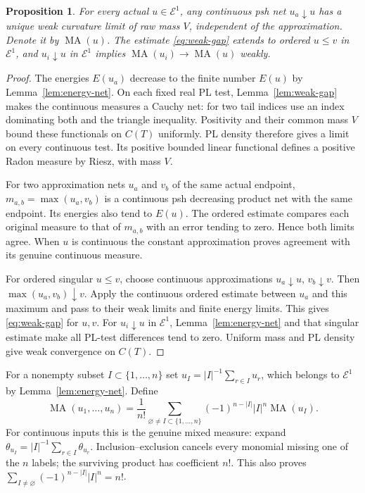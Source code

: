 \documentclass[11pt]{article}
\newtheorem{proposition}[theorem]{Proposition}
\newcommand{\MA}{\operatorname{MA}}
\newcommand{\E}{\mathcal E}
\begin{document}
\begin{proposition}\label{prop:pure}
For every actual $u\in\E^1$, any continuous psh net
$u_a\downarrow u$ has a unique weak curvature limit of raw mass
$V$, independent of the approximation. Denote it by $\MA(u)$.
The estimate \eqref{eq:weak-gap} extends to ordered $u\leq v$ in
$\E^1$, and $u_i\downarrow u$ in $\E^1$ implies
$\MA(u_i)\to\MA(u)$ weakly.
\end{proposition}
\begin{proof}
The energies $E(u_a)$ decrease to the finite number $E(u)$ by
Lemma~\ref{lem:energy-net}. On each fixed real PL test,
Lemma~\ref{lem:weak-gap} makes the continuous measures a Cauchy net:
for two tail indices use an index dominating both and the triangle
inequality. Positivity and their common mass $V$ bound these
functionals on $C(T)$ uniformly. PL density therefore gives a limit
on every continuous test. Its positive bounded linear functional
defines a positive Radon measure by Riesz, with mass $V$.

For two approximation nets $u_a$ and $v_b$ of the same actual
endpoint, $m_{a,b}=\max(u_a,v_b)$ is a continuous psh decreasing
product net with the same endpoint. Its energies also tend to $E(u)$.
The ordered estimate compares each original measure to that of
$m_{a,b}$ with an error tending to zero. Hence both limits agree.
When $u$ is continuous the constant approximation proves agreement
with its genuine continuous measure.

For ordered singular $u\leq v$, choose continuous approximations
$u_a\downarrow u$, $v_b\downarrow v$. Then
$\max(u_a,v_b)\downarrow v$. Apply the continuous ordered estimate
between $u_a$ and this maximum and pass to their weak limits and
finite energy limits. This gives \eqref{eq:weak-gap} for $u,v$.
For $u_i\downarrow u$ in $\E^1$, Lemma~\ref{lem:energy-net}
and that singular estimate make all PL-test differences tend to zero.
Uniform mass and PL density give weak convergence on $C(T)$.
\end{proof}

For a nonempty subset $I\subset\{1,\ldots,n\}$ set
$u_I=|I|^{-1}\sum_{r\in I}u_r$, which belongs to $\E^1$ by
Lemma~\ref{lem:energy-net}. Define
\begin{equation}\label{eq:polarization}
 \MA(u_1,\ldots,u_n)=\frac1{n!}
    \sum_{\varnothing\ne I\subset\{1,\ldots,n\}}
       (-1)^{n-|I|}|I|^n\MA(u_I).
\end{equation}
For continuous inputs this is the genuine mixed measure: expand
$\theta_{u_I}=|I|^{-1}\sum_{r\in I}\theta_{u_r}$. Inclusion--exclusion
cancels every monomial missing one of the $n$ labels; the surviving
product has coefficient $n!$. This also proves
$\sum_{I\ne\varnothing}(-1)^{n-|I|}|I|^n=n!$.
\end{document}
